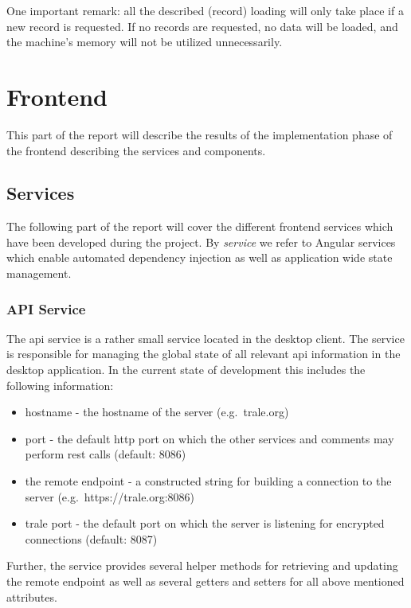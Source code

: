 One important remark: all the described (record) loading will only take place if a new record is requested.
If no records are requested, no data will be loaded, and the machine's memory will not be utilized unnecessarily.

\section{Frontend}\label{sec:frontend}

This part of the report will describe the results of the implementation phase of the frontend describing the services
and components.

\subsection{Services}\label{subsec:services}

The following part of the report will cover the different frontend services which have been developed during the
project.
By \textit{service} we refer to Angular services which enable automated dependency injection as well as application
wide state management.

\subsubsection{API Service}\label{subsubsec:api-service}

The \ac{api} service is a rather small service located in the desktop client.
The service is responsible for managing the global state of all relevant \ac{api} information in the desktop
application.
In the current state of development this includes the following information:

\begin{itemize}\setlength\itemsep{-0.5em}
    \item hostname - the hostname of the server (e.g.\ trale.org)
    \item port - the default \ac{http} port on which the other services and comments may perform \ac{rest} calls
        (default: 8086)
    \item the remote endpoint - a constructed string for building a connection to the server
        (e.g.\ https://trale.org:8086)
    \item trale port - the default port on which the server is listening for encrypted connections (default: 8087)
\end{itemize}

Further, the service provides several helper methods for retrieving and updating the remote endpoint as well as several
getters and setters for all above mentioned attributes.

